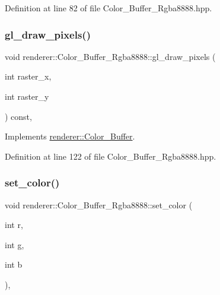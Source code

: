 Definition at line 82 of file Color\+\_\+\+Buffer\+\_\+\+Rgba8888.\+hpp.

\mbox{\label{classrenderer_1_1_color___buffer___rgba8888_afef366739856f8d429cee6ced277d167}} 
\subsubsection{\texorpdfstring{gl\_draw\_pixels()}{gl\_draw\_pixels()}}
{\footnotesize\ttfamily void renderer\+::\+Color\+\_\+\+Buffer\+\_\+\+Rgba8888\+::gl\+\_\+draw\+\_\+pixels (\begin{DoxyParamCaption}\item[{int}]{raster\+\_\+x,  }\item[{int}]{raster\+\_\+y }\end{DoxyParamCaption}) const\hspace{0.3cm}{\ttfamily [inline]}, {\ttfamily [virtual]}}



Implements \mbox{\hyperlink{classrenderer_1_1_color___buffer_a1108142247a2814d028b5ffbcde72d52}{renderer\+::\+Color\+\_\+\+Buffer}}.



Definition at line 122 of file Color\+\_\+\+Buffer\+\_\+\+Rgba8888.\+hpp.

\mbox{\label{classrenderer_1_1_color___buffer___rgba8888_abaeb5e608f4cd3803185de47558bdc58}} 
\subsubsection{\texorpdfstring{set\_color()}{set\_color()}\hspace{0.1cm}{\footnotesize\ttfamily [1/2]}}
{\footnotesize\ttfamily void renderer\+::\+Color\+\_\+\+Buffer\+\_\+\+Rgba8888\+::set\+\_\+color (\begin{DoxyParamCaption}\item[{int}]{r,  }\item[{int}]{g,  }\item[{int}]{b }\end{DoxyParamCaption})\hspace{0.3cm}{\ttfamily [inline]}, {\ttfamily [virtual]}}



